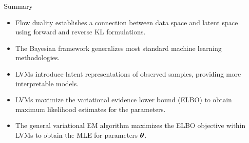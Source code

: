 \documentclass{beamer}
\begin{document}
\begin{frame}{Summary}
	\begin{itemize}
		\item Flow duality establishes a connection between data space and latent space using forward and reverse KL formulations. 
		\vfill
		\item The Bayesian framework generalizes most standard machine learning methodologies.
		\vfill
		\item LVMs introduce latent representations of observed samples, providing more interpretable models.
		\vfill
		\item LVMs maximize the variational evidence lower bound (ELBO) to obtain maximum likelihood estimates for the parameters.
		\vfill
		\item The general variational EM algorithm maximizes the ELBO objective within LVMs to obtain the MLE for parameters $\boldsymbol{\theta}$.	
	\end{itemize}
\end{frame}
\end{document}
